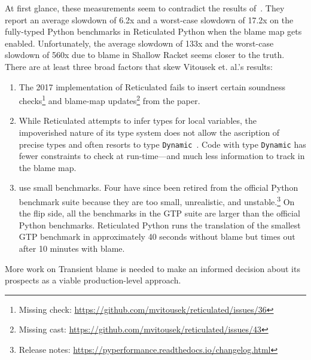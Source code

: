 At first glance, these measurements seem to contradict the results
of~\citet{vss-popl-2017}. They report an average slowdown of 6.2x and a
worst-case slowdown of 17.2x on the fully-typed Python benchmarks in Reticulated
Python when the blame map gets enabled.  Unfortunately, the average slowdown of
133x and the worst-case slowdown of 560x due to blame in Shallow Racket seems
closer to the truth.  There are at least three broad factors that skew Vitousek
et. al.'s results:
\begin{enumerate}

\item The 2017 implementation of Reticulated fails to insert certain soundness
checks\footnote{Missing check:
\url{https://github.com/mvitousek/reticulated/issues/36}} and blame-map
updates\footnote{Missing cast:
\url{https://github.com/mvitousek/reticulated/issues/43}} from the paper.

\item While Reticulated attempts to infer types for local variables, the impoverished nature of its type
    system does not allow the ascription of precise types and often resorts
    to type {\tt Dynamic}~\citep[section~5.4.4]{g-dissertation-2020}. 
    Code with type {\tt Dynamic}
    has fewer constraints to check at run-time---and much less information
    to track in the blame map.

\item \citet{vss-popl-2017} use small benchmarks.  Four have since been retired
from the official Python benchmark suite because they are too small,
unrealistic, and unstable.\footnote{Release notes:
\url{https://pyperformance.readthedocs.io/changelog.html}}  On the flip
    side, all the benchmarks in the GTP suite are larger than the official Python
    benchmarks. Reticulated Python  runs the
    translation of the smallest GTP benchmark in
    approximately 40 seconds without blame but times out after 10 minutes
    with blame.

\end{enumerate}
More work on Transient blame is needed to make an informed decision about
its prospects as a viable production-level approach. 


